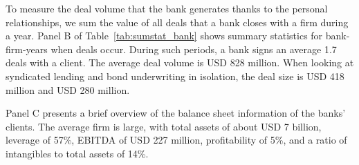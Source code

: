 To measure the deal volume that the bank generates thanks to the personal relationships, we sum the value of all deals that a bank closes with a firm during a year. Panel B of Table~\ref{tab:sumstat_bank} shows summary statistics for bank-firm-years when deals occur. During such periods, a bank signs an average 1.7 deals with a client. The average deal volume is USD 828 million. When looking at syndicated lending and bond underwriting in isolation, the deal size is USD 418 million and USD 280 million. %

Panel C presents a brief overview of the balance sheet information of the banks' clients. The average firm is large, with total assets of about USD 7 billion, leverage of 57\%, EBITDA of USD 227 million, profitability of 5\%, and a ratio of intangibles to total assets of 14\%. 

